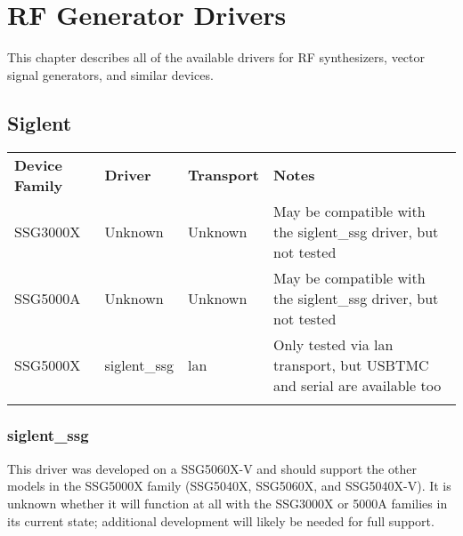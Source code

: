 \chapter{RF Generator Drivers}
\label{sec:rfgen-drivers}

This chapter describes all of the available drivers for RF synthesizers, vector signal generators, and similar devices.

\section{Siglent}

\begin{tabularx}{16cm}{lllX}
\thickhline
\textbf{Device Family} & \textbf{Driver} & \textbf{Transport} & \textbf{Notes} \\
\thickhline
SSG3000X & Unknown & Unknown & May be compatible with the siglent\_ssg driver, but not tested\\
SSG5000A & Unknown & Unknown & May be compatible with the siglent\_ssg driver, but not tested\\
SSG5000X & siglent\_ssg & lan & Only tested via lan transport, but USBTMC and serial are available too\\
\thickhline
\end{tabularx}

\subsection{siglent\_ssg}

This driver was developed on a SSG5060X-V and should support the other models in the SSG5000X family (SSG5040X,
SSG5060X, and SSG5040X-V). It is unknown whether it will function at all with the SSG3000X or 5000A families in its
current state; additional development will likely be needed for full support.
